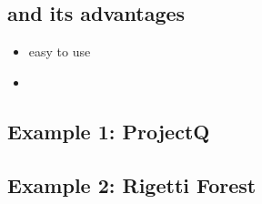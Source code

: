 \documentclass{beamer}
\begin{document}
\subsection{and its advantages}
\begin{frame}{\insertsection}{\insertsubsection}
	\begin{itemize}
		\item easy to use
		\item 
	\end{itemize}
\end{frame}

\subsection{Example 1: ProjectQ}

\begin{frame}{\insertsection}{\insertsubsection}
	
\end{frame}


\begin{frame}{\insertsection}{\insertsubsection}
	
\end{frame}


\begin{frame}{\insertsection}{\insertsubsection}
	
\end{frame}

\begin{frame}{\insertsection}{\insertsubsection}
	
\end{frame}


\subsection{Example 2: Rigetti Forest}

\begin{frame}{\insertsection}{\insertsubsection}
	
\end{frame}
\end{document}
